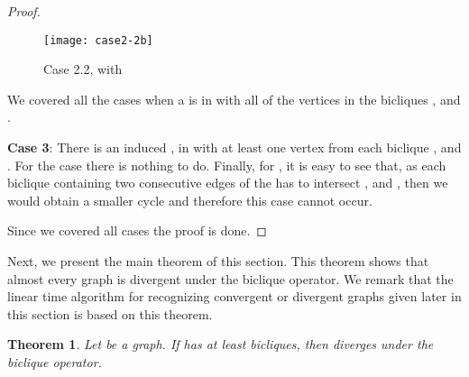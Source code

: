 \documentclass[12pt]{article}
\newtheorem{theorem}{Theorem}[section]
\begin{document}
\begin{proof}
\begin{figure}[ht!]    
	\centering
	\texttt{[image: case2-2b]}
	\caption{Case 2.2, with }
	\label{case2-2b}
\end{figure}


We covered all the cases when a  is in  with all of the vertices
in the bicliques ,  and .

\textbf{Case 3}: There is an induced ,  in  with at least one vertex from each
biclique ,  and . For the case  there is nothing to do.
Finally, for , it is easy to see that, as each biclique containing two consecutive edges of the  has
to intersect ,  and , then we would obtain a smaller cycle and therefore this case cannot occur.

Since we covered all cases the proof is done.

\end{proof}

Next, we present the main theorem of this section. This theorem shows that almost every graph is divergent under the biclique operator.
We remark that the linear time algorithm for recognizing convergent or divergent graphs given later in this section is based on this theorem.

\begin{theorem}
Let  be a graph. If  has at least  bicliques, then  diverges under the biclique operator.
\end{theorem}
\end{document}
